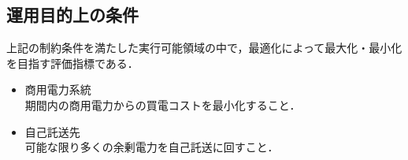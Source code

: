 \subsection{運用目的上の条件}
上記の制約条件を満たした実行可能領域の中で，最適化によって最大化・最小化を目指す評価指標である．
\begin{itemize}
	\item 商用電力系統 \\
	期間内の商用電力からの買電コストを最小化すること．
	\item 自己託送先 \\
	可能な限り多くの余剰電力を自己託送に回すこと．
\end{itemize}

